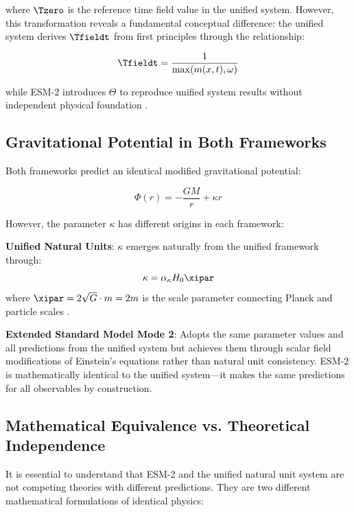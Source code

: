 	where $\Tzero$ is the reference time field value in the unified system. However, this transformation reveals a fundamental conceptual difference: the unified system derives $\Tfieldt$ from first principles through the relationship:
	
	\begin{equation}
		\Tfieldt = \frac{1}{\max(m(x,t), \omega)}
	\end{equation}
	
	while ESM-2 introduces $\Theta$ to reproduce unified system results without independent physical foundation \cite{pascher_lagrangian_2025}.
	
	\subsection{Gravitational Potential in Both Frameworks}
	\label{subsec:gravitational_potential}
	
	Both frameworks predict an identical modified gravitational potential:
	
	\begin{equation}
		\Phi(r) = -\frac{GM}{r} + \kappa r
	\end{equation}
	
	However, the parameter $\kappa$ has different origins in each framework:
	
	\textbf{Unified Natural Units}: $\kappa$ emerges naturally from the unified framework through:
	\begin{equation}
		\kappa = \alpha_\kappa H_0 \xipar
	\end{equation}
	where $\xipar = 2\sqrt{G} \cdot m = 2m$ is the scale parameter connecting Planck and particle scales \cite{pascher_beta_derivation_2025}.
	
	\textbf{Extended Standard Model Mode 2}: Adopts the same parameter values and all predictions from the unified system but achieves them through scalar field modifications of Einstein's equations rather than natural unit consistency. ESM-2 is mathematically identical to the unified system—it makes the same predictions for all observables by construction.
	
	\subsection{Mathematical Equivalence vs. Theoretical Independence}
	\label{subsec:equivalence_vs_independence}
	
	It is essential to understand that ESM-2 and the unified natural unit system are not competing theories with different predictions. They are two different mathematical formulations of identical physics:
	
